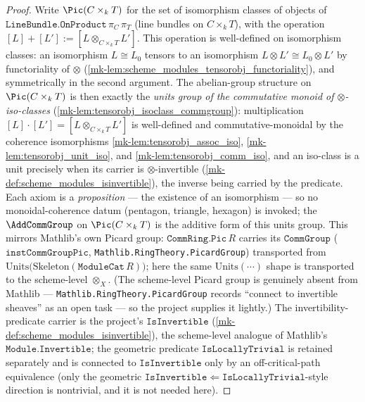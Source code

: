 \begin{proof}
  \leanok
  Write \(\Pic(C \times_k T)\) for the set of isomorphism classes of objects
  of \(\texttt{LineBundle.OnProduct}\,\pi_C\,\pi_T\) (line bundles on
  \(C \times_k T\)), with the operation
  \([L] + [L'] := [L \otimes_{C \times_k T} L']\). This operation is
  well-defined on isomorphism classes: an isomorphism \(L \cong L_0\) tensors
  to an isomorphism \(L \otimes L' \cong L_0 \otimes L'\) by functoriality of
  \(\otimes\) (\ref{mk-lem:scheme_modules_tensorobj_functoriality}), and
  symmetrically in the second argument. The abelian-group structure on
  \(\Pic(C \times_k T)\) is then exactly the \emph{units group of the
  commutative monoid of \(\otimes\)-iso-classes}
  (\ref{mk-lem:tensorobj_isoclass_commgroup}): multiplication
  \([L]\cdot[L'] = [L \otimes_{C\times_k T} L']\) is well-defined and
  commutative-monoidal by the coherence isomorphisms
  \ref{mk-lem:tensorobj_assoc_iso}, \ref{mk-lem:tensorobj_unit_iso}, and
  \ref{mk-lem:tensorobj_comm_iso},
  and an iso-class is a unit precisely when its carrier is
  \(\otimes\)-invertible (\ref{mk-def:scheme_modules_isinvertible}), the inverse
  being carried by the predicate. Each axiom is a \emph{proposition} --- the
  existence of an isomorphism --- so no monoidal-coherence datum (pentagon,
  triangle, hexagon) is invoked; the \(\AddCommGroup\) on
  \(\Pic(C \times_k T)\) is the additive form of this units group. This mirrors
  Mathlib's own Picard group: \(\mathtt{CommRing.Pic}\,R\) carries its
  \(\mathtt{CommGroup}\) (\(\mathtt{instCommGroupPic}\),
  \texttt{Mathlib.RingTheory.PicardGroup}) transported from
  \(\mathrm{Units}\bigl(\mathrm{Skeleton}(\mathtt{ModuleCat}\,R)\bigr)\); here
  the same \(\mathrm{Units}(\cdots)\) shape is transported to the scheme-level
  \(\otimes_X\). (The scheme-level Picard group is genuinely absent from
  Mathlib --- \texttt{Mathlib.RingTheory.PicardGroup} records ``connect to
  invertible sheaves'' as an open task --- so the project supplies it lightly.)
  The invertibility-predicate carrier is the project's \(\mathtt{IsInvertible}\)
  (\ref{mk-def:scheme_modules_isinvertible}), the scheme-level analogue of
  Mathlib's \(\mathtt{Module.Invertible}\); the geometric predicate
  \(\mathtt{IsLocallyTrivial}\) is retained separately and is connected to
  \(\mathtt{IsInvertible}\) only by an off-critical-path equivalence (only the
  geometric \(\mathtt{IsInvertible} \Leftarrow \mathtt{IsLocallyTrivial}\)-style
  direction is nontrivial, and it is not needed here).


\end{proof}
